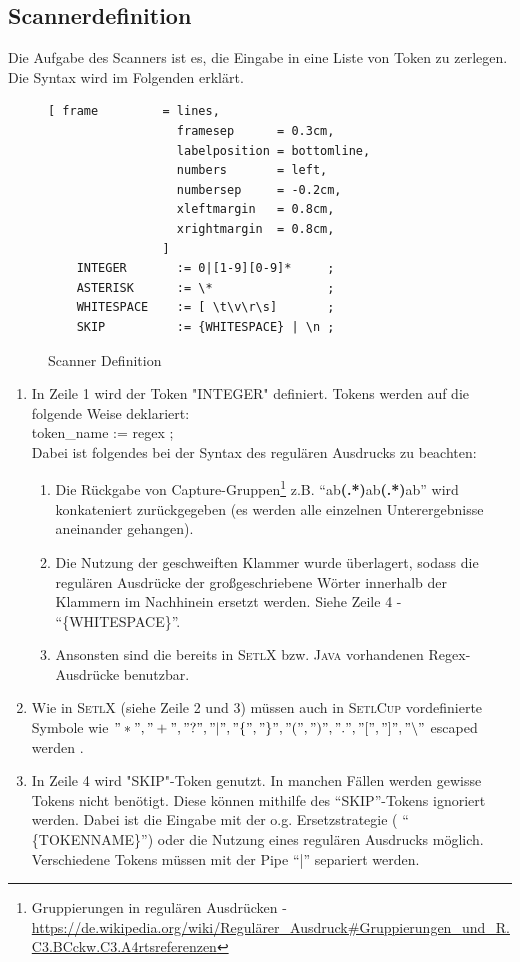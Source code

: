 \subsection{Scannerdefinition}
Die Aufgabe des Scanners ist es, die Eingabe in eine Liste von Token zu zerlegen. Die Syntax wird im Folgenden erklärt.
\begin{figure}[!ht]
\begin{Verbatim}[ frame         = lines, 
                  framesep      = 0.3cm, 
                  labelposition = bottomline,
                  numbers       = left,
                  numbersep     = -0.2cm,
                  xleftmargin   = 0.8cm,
                  xrightmargin  = 0.8cm,
                ]
	INTEGER       := 0|[1-9][0-9]*     ;
	ASTERISK      := \*                ;
	WHITESPACE    := [ \t\v\r\s]       ;
	SKIP          := {WHITESPACE} | \n ;
\end{Verbatim}
\caption{Scanner Definition}
\label{fig:scanner_def}
\end{figure}
\begin{enumerate}
	\item In Zeile 1 wird der Token "INTEGER" definiert. Tokens werden auf die folgende Weise deklariert:\\
					token\_name := regex ; \\
					Dabei ist folgendes bei der Syntax des regulären Ausdrucks zu beachten:
					\begin{enumerate}
						\item Die Rückgabe von Capture-Gruppen\footnote{Gruppierungen in regulären Ausdrücken -  \url{https://de.wikipedia.org/wiki/Regulärer_Ausdruck\#Gruppierungen_und_R.C3.BCckw.C3.A4rtsreferenzen}} z.B. "`ab\textbf{(.*)}ab\textbf{(.*)}ab"'	wird konkateniert zurückgegeben (es werden alle einzelnen Unterergebnisse aneinander gehangen).
						\item Die Nutzung der geschweiften Klammer wurde überlagert, sodass die regulären Ausdrücke der großgeschriebene Wörter innerhalb der Klammern im Nachhinein ersetzt werden. Siehe Zeile 4 - "`\{WHITESPACE\}"'.
						\item Ansonsten sind die bereits in \textsc{SetlX} bzw. \textsc{Java} vorhandenen Regex-Ausdrücke benutzbar.
					\end{enumerate}
	\item Wie in \textsc{SetlX} (siehe Zeile 2 und 3) müssen auch in \textsc{SetlCup} vordefinierte Symbole wie $"*","+","?","|","\{","\}","(",")",".","[","]","\backslash"$ escaped werden .
	\item In Zeile 4 wird "SKIP"-Token genutzt. In manchen Fällen werden gewisse Tokens nicht benötigt. Diese können mithilfe des "`SKIP"'-Tokens ignoriert werden. Dabei ist die Eingabe mit der o.g. Ersetzstrategie ( "` \{TOKENNAME\}"') oder die Nutzung eines regulären Ausdrucks möglich. Verschiedene Tokens müssen mit der Pipe "`|"' separiert werden.
\end{enumerate}

